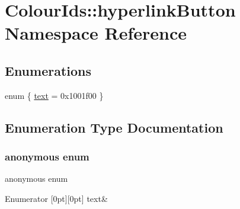 \hypertarget{namespaceColourIds_1_1hyperlinkButton}{}\section{Colour\+Ids\+:\+:hyperlink\+Button Namespace Reference}
\label{namespaceColourIds_1_1hyperlinkButton}
\subsection*{Enumerations}
\begin{DoxyCompactItemize}
\item 
enum \{ \mbox{\hyperlink{namespaceColourIds_1_1hyperlinkButton_a32e966bd0b83d91ecc829b3f77a58d5ea1473d6aa2679ad502646597fbd83d04a}{text}} = 0x1001f00
 \}
\end{DoxyCompactItemize}


\subsection{Enumeration Type Documentation}
\mbox{\label{namespaceColourIds_1_1hyperlinkButton_a32e966bd0b83d91ecc829b3f77a58d5e}} 
\subsubsection{\texorpdfstring{anonymous enum}{anonymous enum}}
{\footnotesize\ttfamily anonymous enum}

\begin{DoxyEnumFields}{Enumerator}
[0pt][0pt]{}\mbox{\label{namespaceColourIds_1_1hyperlinkButton_a32e966bd0b83d91ecc829b3f77a58d5ea1473d6aa2679ad502646597fbd83d04a}} 
text&\\
\hline

\end{DoxyEnumFields}

